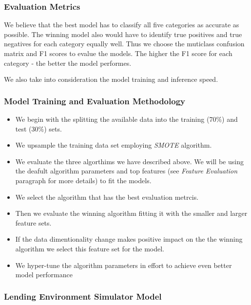 \hypertarget{evaluation-metrics}{%
\subsubsection{Evaluation Metrics}\label{evaluation-metrics}}

We believe that the best model has to classify all five categories as
accurate as possible. The winning model also would have to identify true
positives and true negatives for each category equally well. Thus we
choose the muticlass confusion matrix and F1 scores to evalue the
models. The higher the F1 score for each category - the better the model
performes.

We also take into consideration the model training and inference speed.

\hypertarget{model-training-and-evaluation-methodology}{%
\subsubsection{Model Training and Evaluation
Methodology}\label{model-training-and-evaluation-methodology}}

\begin{itemize}
\tightlist
\item
  We begin with the splitting the available data into the training
  (70\%) and test (30\%) sets.
\item
  We upsample the training data set employing \emph{SMOTE} algorithm.
\item
  We evaluate the three algorthims we have described above. We will be
  using the deafult algorithm parameters and top features (see
  \emph{Feature Evaluation} paragraph for more details) to fit the
  models.
\item
  We select the algorithm that has the best evaluation metrcis.
\item
  Then we evaluate the winning algorithm fitting it with the smaller and
  larger feature sets.
\item
  If the data dimentionality change makes positive impact on the the
  winning algorithm we select this feature set for the model.
\item
  We hyper-tune the algorithm parameters in effort to achieve even
  better model performance
\end{itemize}

\hypertarget{lending-environment-simulator-model}{%
\subsubsection{Lending Environment Simulator
Model}\label{lending-environment-simulator-model}}

